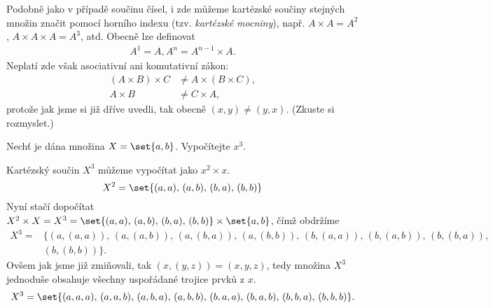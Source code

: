 Podobně jako v případě součinu čísel, i zde můžeme kartézské součiny stejných množin značit pomocí horního indexu (tzv. \emph{kartézské mocniny}), např. $A\times A=A^2$, $A\times A\times A=A^3$, atd. Obecně lze definovat
\begin{align*}
    A^1=A,
    A^n=A^{n-1}\times A.
\end{align*}
Neplatí zde však asociativní ani komutativní zákon:
\begin{align*}
    (A\times B)\times C&\neq A\times (B\times C),\\
    A\times B&\neq C\times A,
\end{align*}
protože jak jsme si již dříve uvedli, tak obecně $(x,y)\neq (y,x)$. (Zkuste si rozmyslet.)
\begin{example}
    Nechť je dána množina $X=\set{a,b}$. Vypočítejte $x^3$.
\end{example}
\begin{solution}
    Kartézský součin $X^3$ můžeme vypočítat jako $x^2\times x$.
    \begin{equation*}
        X^2=\set{(a,a),\,(a,b),\,(b,a),\,(b,b)}
    \end{equation*}
    Nyní stačí dopočítat $X^2\times X=X^3=\set{(a,a),\,(a,b),\,(b,a),\,(b,b)}\times\set{a,b}$, čímž obdržíme
    \begin{align*}
        X^3=&\{(a,(a,a)),\,(a,(a,b)),\,(a,(b,a)),\,(a,(b,b)),\,(b,(a,a)),\,(b,(a,b)),\,(b,(b,a)),\\
        &(b,(b,b))\}.
    \end{align*}
    Ovšem jak jsme již zmiňovali, tak $(x,(y,z))=(x,y,z)$, tedy množina $X^3$ jednoduše obsahuje všechny uspořádané trojice prvků z $x$.
    \begin{equation*}
        X^3=\set{(a,a,a),\,(a,a,b),\,(a,b,a),\,(a,b,b),\,(b,a,a),\,(b,a,b),\,(b,b,a),\,(b,b,b)}.
    \end{equation*}
\end{solution}